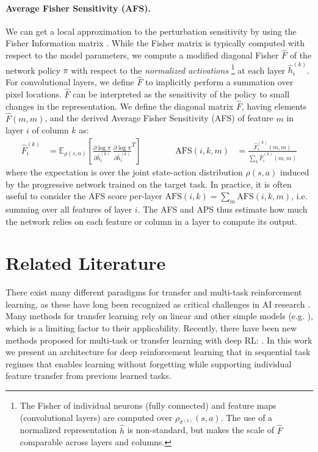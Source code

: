 \documentclass{article}
\begin{document}
\paragraph{Average Fisher Sensitivity (AFS).}
We can get a local approximation to the perturbation sensitivity by using
the Fisher Information matrix
\cite{amari98natural}. While the Fisher matrix is typically computed with
respect to the model
parameters, we compute a modified diagonal Fisher $\hat{F}$ of the network policy $\pi$
with respect to the \textit{normalized activations}
\footnote{The Fisher of individual neurons (fully connected) and feature maps
(convolutional layers) are computed over $\rho_{\pi^{(k)}}(s,a)$. The use of a normalized
representation $\hat{h}$ is non-standard, but makes the scale of $\hat{F}$
comparable across layers and columns.}
at each layer $\hat{h}_i^{(k)}$. For convolutional layers, we define
$\hat{F}$ to implicitly perform a summation over pixel locations. $\hat{F}$ can
be interpreted as the sensitivity of the policy to small changes in the
representation. We define the diagonal matrix $\hat{F}$, having
elements $\hat{F}(m,m)$, and the derived Average Fisher
Sensitivity (AFS) of feature $m$ in layer $i$ of column $k$ as:
\begin{align*}
\hat{F}_i^{(k)} &=
     \mathbb{E}_{\rho(s, a)}
        \left[
          \frac {\partial \log \pi} {\partial \hat{h}_i^{(k)}} \,
          \frac {\partial \log \pi} {\partial \hat{h}_i^{(k)}}^T
        \right]
& \hspace{1cm} &
\text{AFS}(i,k,m) &=
    \frac{\hat{F}_i^{(k)}(m,m)}{\sum_k \hat{F}_i^{(k)}(m,m)}
\end{align*}
where the expectation is over the joint state-action distribution $\rho(s,a)$
induced by the progressive network
trained on the target task. In practice, it is often useful to consider the AFS
score per-layer $\text{AFS}(i,k) = \sum_m \text{AFS}(i,k,m)$, i.e. summing over
all features of layer $i$. The AFS and APS thus estimate how much
the network relies on each feature or column in a layer to compute its output.



\section{Related Literature}

There exist many different paradigms for transfer and
multi-task reinforcement learning, as these have long been recognized 
as critical challenges in AI research
\cite{Ring1995,SilverYL13,AAAIMag11-Taylor}. Many methods for transfer
learning rely on linear and other simple models
(e.g. \citep{Ruvolo2013ELLA}), which is a limiting factor to their
applicability. Recently, there have been new methods proposed for
multi-task or transfer learning with deep RL:
\cite{tessler2016,Rusu15,ParisottoICLR16}. In this
work we present an architecture for deep reinforcement learning that
in sequential task regimes that enables learning without forgetting
while supporting individual feature transfer from previous
learned tasks.
\end{document}

